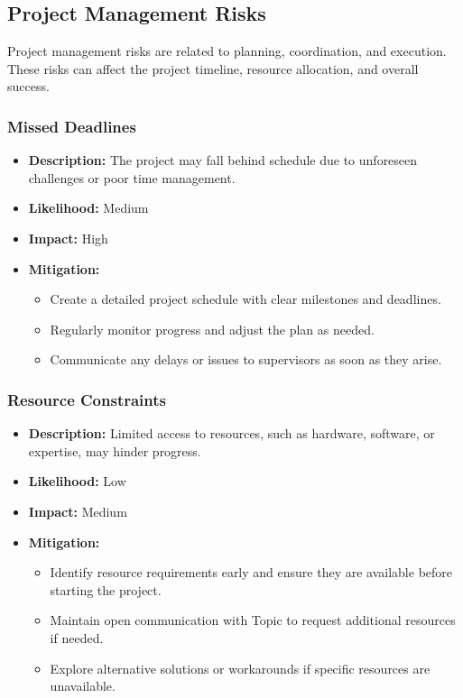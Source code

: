 \documentclass{article}
\begin{document}
\subsection{Project Management Risks}
Project management risks are related to planning, coordination, and execution. These risks can affect the project timeline, resource allocation, and overall success.

\subsubsection{Missed Deadlines}
\begin{itemize}
    \item \textbf{Description:} The project may fall behind schedule due to unforeseen challenges or poor time management.
    \item \textbf{Likelihood:} Medium
    \item \textbf{Impact:} High
    \item \textbf{Mitigation:}
        \begin{itemize}
            \item Create a detailed project schedule with clear milestones and deadlines.
            \item Regularly monitor progress and adjust the plan as needed.
            \item Communicate any delays or issues to supervisors as soon as they arise.
        \end{itemize}
\end{itemize}

\subsubsection{Resource Constraints}
\begin{itemize}
    \item \textbf{Description:} Limited access to resources, such as hardware, software, or expertise, may hinder progress.
    \item \textbf{Likelihood:} Low
    \item \textbf{Impact:} Medium
    \item \textbf{Mitigation:}
        \begin{itemize}
            \item Identify resource requirements early and ensure they are available before starting the project.
            \item Maintain open communication with Topic to request additional resources if needed.
            \item Explore alternative solutions or workarounds if specific resources are unavailable.
        \end{itemize}
\end{itemize}
\end{document}
